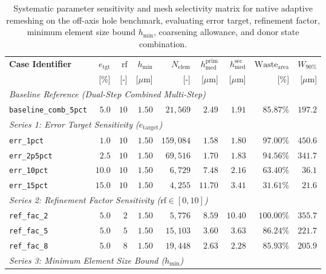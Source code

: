 \begin{table}[htbp]
\centering
\small
\caption{Systematic parameter sensitivity and mesh selectivity matrix for native \Abaqus adaptive remeshing on the off-axis hole benchmark, evaluating error target, refinement factor, minimum element size bound $h_{\min}$, coarsening allowance, and donor state combination.}
\label{tab:f1685_sizing_matrix}
\begin{tabularx}{\textwidth}{lrrrrrrrr}
\hline
\textbf{Case Identifier} & $e_{\mathrm{tgt}}$ & $\mathrm{rf}$ & $h_{\min}$ & $N_{\mathrm{elem}}$ & $h_{\mathrm{med}}^{\mathrm{prim}}$ & $h_{\mathrm{med}}^{\mathrm{sec}}$ & $\mathrm{Waste}_{\mathrm{area}}$ & $W_{90\%}$ \\
                         & [\%]               & [-]           & [$\mu\mathrm{m}$] & [-] & [$\mu\mathrm{m}$] & [$\mu\mathrm{m}$] & [\%] & [$\mu\mathrm{m}$] \\
\hline
\multicolumn{9}{l}{\textit{Baseline Reference (Dual-Step Combined Multi-Step)}} \\
\texttt{baseline\_comb\_5pct} & $5.0$ & $10$ & $1.50$ & $21{,}569$ & $2.49$ & $1.91$ & $85.87\%$ & $197.2$ \\
\hline
\multicolumn{9}{l}{\textit{Series 1: Error Target Sensitivity ($e_{\mathrm{target}}$)}} \\
\texttt{err\_1pct}             & $1.0$ & $10$ & $1.50$ & $159{,}084$ & $1.58$ & $1.80$ & $97.00\%$ & $450.6$ \\
\texttt{err\_2p5pct}           & $2.5$ & $10$ & $1.50$ & $69{,}516$ & $1.70$ & $1.83$ & $94.56\%$ & $341.7$ \\
\texttt{err\_10pct}            & $10.0$ & $10$ & $1.50$ & $6{,}729$ & $7.48$ & $2.16$ & $63.40\%$ & $36.1$ \\
\texttt{err\_15pct}            & $15.0$ & $10$ & $1.50$ & $4{,}255$ & $11.70$ & $3.41$ & $31.61\%$ & $21.6$ \\
\hline
\multicolumn{9}{l}{\textit{Series 2: Refinement Factor Sensitivity ($\mathrm{rf} \in [0, 10]$)}} \\
\texttt{ref\_fac\_2}           & $5.0$ & $2$ & $1.50$ & $5{,}776$ & $8.59$ & $10.40$ & $100.00\%$ & $355.7$ \\
\texttt{ref\_fac\_5}           & $5.0$ & $5$ & $1.50$ & $15{,}103$ & $3.60$ & $3.63$ & $86.24\%$ & $221.7$ \\
\texttt{ref\_fac\_8}           & $5.0$ & $8$ & $1.50$ & $19{,}448$ & $2.63$ & $2.28$ & $85.93\%$ & $205.9$ \\
\hline
\multicolumn{9}{l}{\textit{Series 3: Minimum Element Size Bound ($h_{\min}$)}} \\

\end{tabularx}
\end{table}
